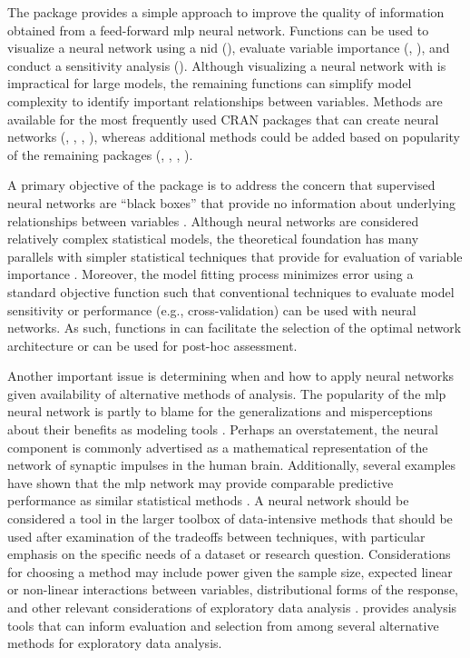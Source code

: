 \documentclass[article]{jss}
\begin{document}
The  package provides a simple approach to improve
the quality of information obtained from a feed-forward \ac{mlp}
neural network.  Functions can be used to visualize a neural network
using a \acl{nid} (), evaluate variable importance
(, ), and conduct a sensitivity analysis
().  Although visualizing a neural network with
 is impractical for large models, the remaining
functions can simplify model complexity to identify important
relationships between variables.  Methods are available for the most
frequently used \ac{CRAN} packages that can create neural networks
(, , , ), whereas
additional methods could be added based on popularity of the remaining
packages (, , , ).

A primary objective of the package is to address the concern that
supervised neural networks are ``black boxes'' that provide no
information about underlying relationships between variables
\citep{Paruelo97,Olden02}.  Although neural networks are considered
relatively complex statistical models, the theoretical foundation has
many parallels with simpler statistical techniques that provide for
evaluation of variable importance \citep{Cheng94}.  Moreover, the model
fitting process minimizes error using a standard objective function
such that conventional techniques to evaluate model sensitivity or
performance (e.g., cross-validation) can be used with neural networks.
As such, functions in  can facilitate the
selection of the optimal network architecture or can be used for
post-hoc assessment.

Another important issue is determining when and how to apply neural
networks given availability of alternative methods of analysis.  The
popularity of the \ac{mlp} neural network is partly to blame for the
generalizations and misperceptions about their benefits as modeling
tools \citep{Burke97}. Perhaps an overstatement, the neural component
is commonly advertised as a mathematical representation of the network
of synaptic impulses in the human brain.  Additionally, several
examples have shown that the \ac{mlp} network may provide comparable
predictive performance as similar statistical methods
\citep{Feng02,Razi05,Beck14a}.  A neural network should be considered
a tool in the larger toolbox of data-intensive methods that should be
used after examination of the tradeoffs between techniques, with
particular emphasis on the specific needs of a dataset or research
question.  Considerations for choosing a method may include power
given the sample size, expected linear or non-linear interactions
between variables, distributional forms of the response, and other
relevant considerations of exploratory data analysis \citep{Zuur10}.
 provides analysis tools that can inform
evaluation and selection from among several alternative methods for
exploratory data analysis.
\end{document}

